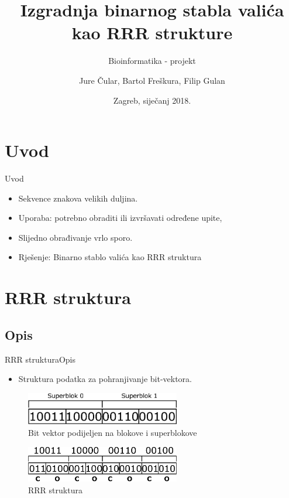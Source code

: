 \documentclass{beamer}
\author{Jure Čular, Bartol Freškura, Filip Gulan}
\title{Izgradnja binarnog stabla valića kao RRR strukture}
\subtitle{Bioinformatika - projekt}
\institute[FER]{Sveučilište u Zagrebu \\ Fakultet elektrotehnike i računarstva}
\date{Zagreb, siječanj 2018.}
\begin{document}
\begin{frame}
\maketitle
\end{frame}



\section{Uvod}
\begin{frame}{Uvod}
  \begin{itemize}
      \item {
        Sekvence znakova velikih duljina.
      }
      \item{
        Uporaba: potrebno obraditi ili izvršavati određene upite,
      }
      \item{
        Slijedno obrađivanje vrlo sporo.
      }
      \item{
        Rješenje: Binarno stablo valića kao RRR struktura
      }
  \end{itemize}
\end{frame}

\section{RRR struktura}
\subsection{Opis}

\begin{frame}{RRR struktura}{Opis}
  \begin{itemize}
  \item {
    Struktura podatka za pohranjivanje bit-vektora.
  }
  \end{itemize}
     \begin{figure}[H]
    \centering
    \includegraphics[width=0.6\textwidth]{img/superblocks.pdf}
    \caption{Bit vektor podijeljen na blokove i superblokove}
    \end{figure}
    \begin{figure}[H]
    \centering
    \includegraphics[width=0.6\textwidth]{img/coded.pdf}
    \caption{RRR struktura}
    \end{figure}

\end{frame}
\end{document}
